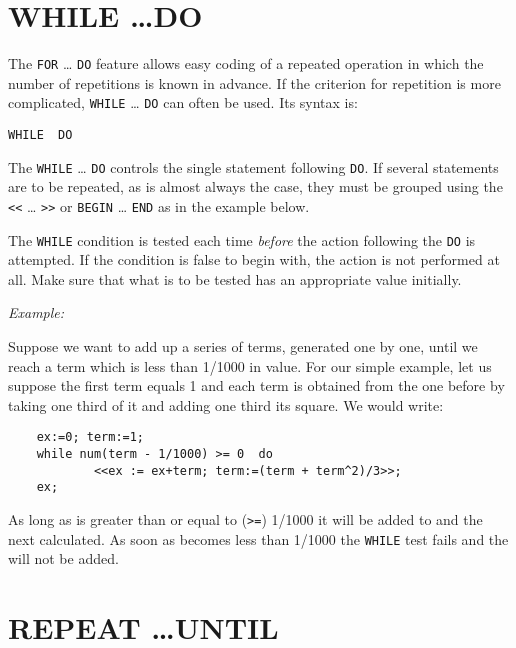 \section{WHILE \ldots DO}
\hypertarget{command:WHILE}{}

The \texttt{FOR} \ldots{} \texttt{DO} feature
allows easy coding of a repeated operation in which the number of repetitions
is known in advance.  If the criterion for repetition is more complicated,
\texttt{WHILE} \ldots{} \texttt{DO} can often be used.  Its syntax is:
\begin{syntax}
  \texttt{WHILE }\texttt{ DO }
\end{syntax}
The \texttt{WHILE} \ldots{} \texttt{DO} controls the single statement
following \texttt{DO}.
If several statements are to be repeated, as is almost always the case,
they must be grouped using the \texttt{<}\texttt{<} \ldots{} \texttt{>}\texttt{>}
or \texttt{BEGIN} \ldots{} \texttt{END}
as in the example below.

The \texttt{WHILE} condition is tested each time \emph{before} the action
following the \texttt{DO} is attempted.  If the condition is false to begin
with, the action is not performed at all.  Make sure that what is to be
tested has an appropriate value initially.

\textit{Example:}

Suppose we want to add up a series of terms, generated one by one, until
we reach a term which is less than 1/1000 in value.  For our simple
example, let us suppose the first term equals 1 and each term is obtained
from the one before by taking one third of it and adding one third its
square. We would write:
\begin{verbatim}
    ex:=0; term:=1;
    while num(term - 1/1000) >= 0  do
            <<ex := ex+term; term:=(term + term^2)/3>>;
    ex;
\end{verbatim}
As long as  is greater than or equal to (\texttt{>=}) 1/1000 it will
be added to  and the next  calculated.  As soon as
 becomes less than 1/1000 the \texttt{WHILE} test fails and the
 will not be added.


\section{REPEAT \ldots UNTIL}
\hypertarget{command:REPEAT}{}
\hypertarget{reserved:UNTIL}{}

